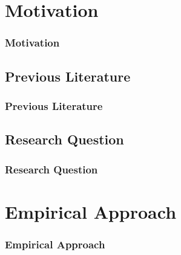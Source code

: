 \documentclass[11pt, aspectratio=1610, xcolor={dvipsnames}]{beamer}
\begin{document}
	\section{Motivation}
	\begin{frame}
		\frametitle{Motivation}
	\end{frame}
	
	\begin{frame}
		\frametitle{}
	\end{frame}
	
	\subsection{Previous Literature}
	\begin{frame}
		\frametitle{Previous Literature}
	\end{frame}
	
	\begin{frame}
		\frametitle{}
	\end{frame}
	
	\subsection{Research Question}
	\begin{frame}
		\frametitle{Research Question}
	\end{frame}
	
	\begin{frame}
		\frametitle{}
	\end{frame}
	
	\section{Empirical Approach}
	\begin{frame}
		\frametitle{Empirical Approach}
	\end{frame}
	
\end{document}
